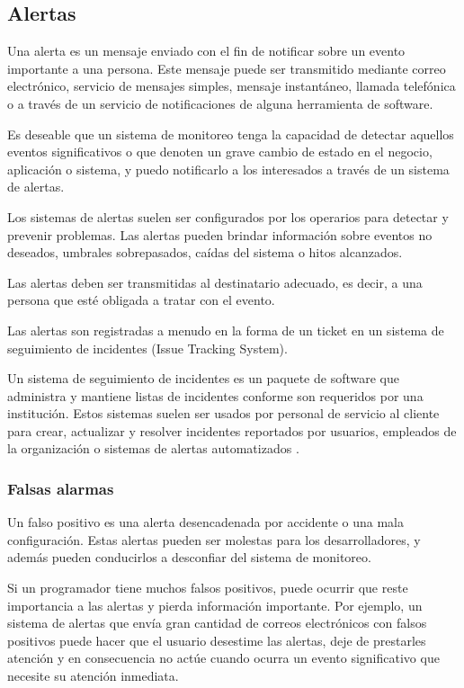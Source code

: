 \subsection{Alertas} \label{alertas} Una alerta es un mensaje enviado con el
fin de notificar sobre un evento importante a una persona. Este mensaje puede
ser transmitido mediante correo electrónico, servicio de mensajes simples,
mensaje instantáneo, llamada telefónica o a través de un servicio de
notificaciones de alguna herramienta de software.

Es deseable que un sistema de monitoreo tenga la capacidad de detectar aquellos
eventos significativos o que denoten un grave cambio de estado en el negocio,
aplicación o sistema, y puedo notificarlo a los interesados a través de un
sistema de alertas.

Los sistemas de alertas suelen ser configurados por los operarios para detectar
y prevenir problemas. Las alertas pueden brindar información sobre eventos no
deseados, umbrales sobrepasados, caídas del sistema o hitos alcanzados.

Las alertas deben ser transmitidas al destinatario adecuado, es decir, a una
persona que esté obligada a tratar con el evento.

Las alertas son registradas a menudo en la forma de un ticket en un sistema de
seguimiento de incidentes (Issue Tracking System).

Un sistema de seguimiento de incidentes es un paquete de software que
administra y mantiene listas de incidentes conforme son requeridos por una
institución. Estos sistemas suelen ser usados por personal de servicio al
cliente para crear, actualizar y resolver incidentes reportados por usuarios,
empleados de la organización o sistemas de alertas automatizados
\cite[p~.2]{monitoreo:efective_monitoring_and_alerting}.

\subsubsection*{Falsas alarmas} \label{falsas_alarmas}

Un falso positivo es una alerta desencadenada por accidente o una mala
configuración. Estas alertas pueden ser molestas para los desarrolladores, y
además pueden conducirlos a desconfiar del sistema de monitoreo.

Si un programador tiene muchos falsos positivos, puede ocurrir que reste
importancia a las alertas y pierda información importante. Por ejemplo, un
sistema de alertas que envía gran cantidad de correos electrónicos con falsos
positivos puede hacer que el usuario desestime las alertas, deje de prestarles
atención y en consecuencia no actúe cuando ocurra un evento significativo que
necesite su atención inmediata.

